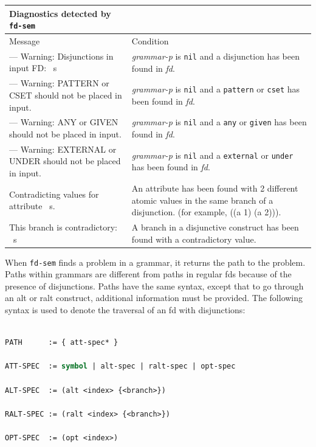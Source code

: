 \documentclass[10pt,a4paper]{report}
\begin{document}
\begin{center}
\begin{tabular}{|p{2in}|p{3in}|}
\hline
Diagnostics detected by {\tt fd-sem} \\ \hline

Message & Condition  \\ \hline

--- Warning: Disjunctions in input FD: ~s  &{\em grammar-p} is 
{\tt nil} and a disjunction has been found in {\em fd}. \\ \hline

--- Warning: PATTERN or CSET should not be placed in input.
&{\em grammar-p} is {\tt nil} and a {\tt pattern} or {\tt cset} has been
found in {\em fd}.  \\ \hline

--- Warning: ANY or GIVEN should not be placed in input.
&{\em grammar-p} is {\tt nil} and a {\tt any} or {\tt given} has been
found in {\em fd}.  \\ \hline

--- Warning: EXTERNAL or UNDER should not be placed in input.
&{\em grammar-p} is {\tt nil} and a {\tt external} or {\tt under} has been
found in {\em fd}.  \\ \hline

Contradicting values for attribute ~s. & An attribute has been
found with 2 different atomic values in the same branch of a
disjunction. (for example, ((a 1) (a 2))). \\ \hline

This branch is contradictory: ~s &A branch in a disjunctive construct has
been found with a contradictory value. \\ \hline
\end{tabular}
\end{center}


When {\tt fd-sem} finds a problem in a grammar, it returns the path to the
problem.  Paths within grammars are different from paths in regular fds
because of the presence of disjunctions.  Paths have the same syntax,
except that to go through an alt or ralt construct, additional information
must be provided.  The following syntax is used to denote the traversal of
an fd with disjunctions:  

\begin{lstlisting}[language=Lisp]

PATH      := { att-spec* }

ATT-SPEC  := symbol | alt-spec | ralt-spec | opt-spec

ALT-SPEC  := (alt <index> {<branch>})

RALT-SPEC := (ralt <index> {<branch>})

OPT-SPEC  := (opt <index>)

\end{lstlisting}
\end{document}
